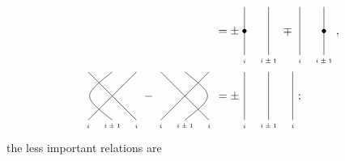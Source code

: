 \documentclass[11pt,reqno]{amsart}
\begin{document}
\begin{align*}
&=\pm 
\raisebox{-0.5em}{$\hackcenter{\begin{tikzpicture}[scale=0.375]
    \draw (0,0)--(0,4);
    \draw (2,0)--(2,4);
    \node at (0,-0.5) {\tiny $i$};
    \node at (2,-0.5) {\tiny $i\pm 1$};
    \fill (0,2) circle (5pt);
\end{tikzpicture}}$}
\mp 
\raisebox{-0.5em}{$\hackcenter{\begin{tikzpicture}[scale=0.375]
    \draw (0,0)--(0,4);
    \draw (2,0)--(2,4);
    \node at (0,-0.5) {\tiny $i$};
    \node at (2,-0.5) {\tiny $i\pm 1$};
    \fill (2,2) circle (5pt);
\end{tikzpicture}}$},\\ 
{}\raisebox{-0.5em}{$\hackcenter{\begin{tikzpicture}[scale=0.375]
    \draw (0,0)--(4,4);
    \draw (4,0)--(0,4);
    \draw (2,0) ..controls(-0.5,2).. (2,4);
    \node at (0,-0.5) {\tiny $i$};
    \node at (2,-0.5) {\tiny $i\pm 1$};
    \node at (4,-0.5) {\tiny $i$};
\end{tikzpicture}}$}
-
\raisebox{-0.5em}{$\hackcenter{\begin{tikzpicture}[scale=0.375]
    \draw (0,0)--(4,4);
    \draw (4,0)--(0,4);
    \draw (2,0) ..controls(4.5,2).. (2,4);
    \node at (0,-0.5) {\tiny $i$};
    \node at (2,-0.5) {\tiny $i\pm 1$};
    \node at (4,-0.5) {\tiny $i$};
\end{tikzpicture}}$}
&=\pm
\raisebox{-0.5em}{$\hackcenter{\begin{tikzpicture}[scale=0.375]
    \draw (0,0)--(0,4);
    \draw (4,0)--(4,4);
    \draw (2,0)--(2,4);
    \node at (0,-0.5) {\tiny $i$};
    \node at (2,-0.5) {\tiny $i\pm 1$};
    \node at (4,-0.5) {\tiny $i$};
\end{tikzpicture}}$};
\end{align*}
the less important relations are 
\end{document}
